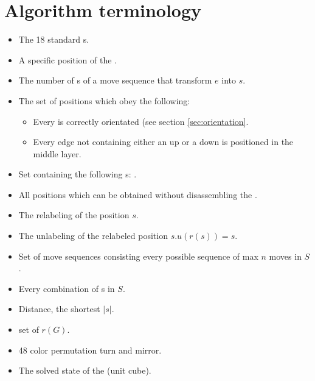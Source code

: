 \section{Algorithm terminology}
\begin{itemize}
\item {}The 18 standard \twist{}s.
\item {}A specific position of the \rubik{}.
\item {}The number of \twist{}s of a move sequence that transform $e$ into $s$.
\item {}The set of positions which obey the following:
\begin{itemize}
	\item Every \cpiece{} is correctly orientated (see section \ref{sec:orientation}.
	\item Every edge \cpiece{} not containing either an up \facelet{} or a down \facelet{} is positioned in the middle layer.
\end{itemize}
\item {}Set containing the following \twist{}s: .
\item {}All positions which can be obtained without disassembling the \rubik{}. 
\item {}The relabeling of the position $s$.
\item {}The unlabeling of the relabeled position $s$.$u(r(s))=s$.
\item {}Set of move sequences consisting every possible sequence of max $n$ moves in $S$.
\item {}Every combination of \twist{}s in $S$.
\item {}Distance, the shortest $|s|$.
\item {}set of $r(G)$.
\item {}48 color permutation turn and mirror.
\item {}The solved state of the \rubik{}(unit cube).
\end{itemize}

